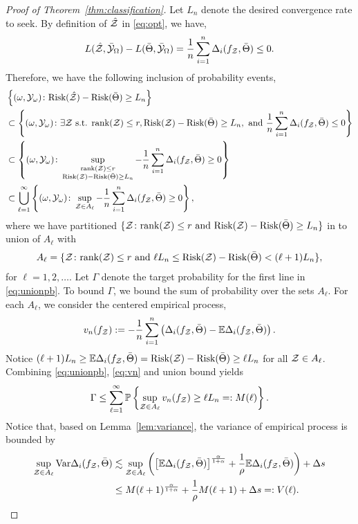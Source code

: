 \documentclass[11pt]{article}
\theoremstyle{plain}
\theoremstyle{definition}
\def\risk{\textup{Risk}}
\begin{document}
\begin{proof}[Proof of Theorem~\ref{thm:classification}]
Let $L_n$ denote the desired convergence rate to seek. By definition of $\hat {\mathcal{Z}}$ in \eqref{eq:opt}, we have, 
\[ L(\hat {\mathcal{Z}},\bar {\mathcal{Y}}_\Omega)-L(\bar \Theta,\bar {\mathcal{Y}}_\Omega) = \frac{1}{n}\sum_{i=1}^n\Delta_i(f_{\mathcal{Z}},\bar \Theta)\leq 0.\]
Therefore, we have the following inclusion of probability events,
\begin{align}\label{eq:unionpb}
&\left\{(\omega,\tY_{\omega})\colon \risk(\hat \tZ)-\risk(\bar\Theta)\geq L_n \right\}\nonumber\\
&\subset\left\{(\omega,\tY_{\omega})\colon\exists \tZ \text{ s.t. } \text{rank}(\tZ)\leq r,  \risk(\tZ)-\risk(\bar\Theta)\geq L_n, \text{ and } \frac{1}{n}\sum_{i=1}^n\Delta_i(f_\tZ,\bar \Theta)\leq 0 \right\}\nonumber\\
&\subset \left\{(\omega,\tY_{\omega})\colon\sup_{\substack{\text{rank}(\tZ)\leq r\\  
\risk(\tZ)-\risk(\bar\Theta)\geq L_n  }}-\frac{1}{n}\sum_{i=1}^n\Delta_i(f_\tZ,\bar \Theta)\geq 0\right\}\nonumber\\
&\subset \bigcup_{\ell=1}^{\infty}\left\{(\omega,\tY_\omega)\colon \sup_{\tZ\in A_{\ell}}-\frac{1}{n}\sum_{i=1}^n\Delta_i(f_\tZ,\bar \Theta)\geq 0\right\},
\end{align}
where we have partitioned $\{\tZ\colon \text{rank}(\tZ)\leq r \text{ and } \risk(\tZ)-\risk(\bar\Theta)\geq L_n\}$ in to union of $A_{\ell}$ with 
\begin{align}
A_{\ell} = \{\tZ\colon \text{rank}(\tZ)\leq r \text{ and } \ell L_n\leq  \risk(\tZ)-\risk(\bar\Theta)<(\ell+1)L_n\},
\end{align}
for $\ell = 1,2,\ldots$. Let $\Gamma$ denote the target probability for the first line in \eqref{eq:unionpb}. To bound $\Gamma$, we bound the sum of probability over the sets $A_{\ell}$.   For each $A_{\ell}$, we consider the centered empirical process,
\begin{align}\label{eq:vn}
v_n(f_{\mathcal{Z}}) := -\frac{1}{n}\sum_{i=1}^n \left(\Delta_i(f_{\mathcal{Z}},\bar \Theta)- \mathbb{E}\Delta_i(f_{\mathcal{Z}},\bar \Theta)\right).
\end{align}
Notice $(\ell+1)L_n\geq \mathbb{E}\Delta_i(f_\tZ,\bar \Theta) =\risk	(\tZ)-\risk(\bar\Theta)\geq \ell L_n$ for all $\mathcal{Z}\in A_{\ell}$.  Combining \eqref{eq:unionpb},  \eqref{eq:vn} and union bound yields
\begin{align}\label{eq:gammabd}
\Gamma\leq \sum_{\ell=1}^\infty\mathbb{P}\left\{\sup_{\mathcal{Z}\in A_{\ell}} v_n(f_{\mathcal{Z}})\geq  \ell L_n=:M(\ell) \right\}.
\end{align}
Notice that, based on Lemma~\ref{lem:variance}, the variance of empirical process is bounded by 
\begin{align}
\sup_{\mathcal{Z}\in A_{\ell}}\textup{Var}\Delta_i(f_{\mathcal{Z}},\bar \Theta)& \lesssim \sup_{\mathcal{Z}\in A_{\ell}}\left( \left[\mathbb{E}\Delta_i(f_{\mathcal{Z}},\bar \Theta)\right]^{\alpha \over 1+\alpha}+{1\over \rho}\mathbb{E}\Delta_i(f_{\mathcal{Z}},\bar \Theta)\right)+\Delta s \\&\leq M(\ell+1)^{\alpha\over 1+\alpha}+\frac{1}{\rho}M(\ell+1) +\Delta s =: V(\ell).
\end{align}


\end{proof}
\end{document}
